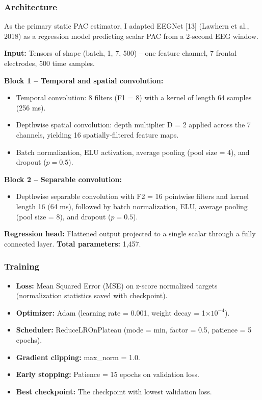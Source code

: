 \documentclass[11pt,letterpaper]{article}
\begin{document}
\subsubsection{Architecture}

As the primary static PAC estimator, I adapted EEGNet [13] (Lawhern et al., 2018) as a regression model predicting scalar PAC from a 2-second EEG window.

\textbf{Input:} Tensors of shape (batch, 1, 7, 500) -- one feature channel, 7 frontal electrodes, 500 time samples.

\textbf{Block 1 -- Temporal and spatial convolution:}

\begin{itemize}[nosep]
  \item Temporal convolution: 8 filters (F1 = 8) with a kernel of length 64 samples (256 ms).
  \item Depthwise spatial convolution: depth multiplier D = 2 applied across the 7 channels, yielding 16 spatially-filtered feature maps.
  \item Batch normalization, ELU activation, average pooling (pool size = 4), and dropout ($p = 0.5$).
\end{itemize}

\textbf{Block 2 -- Separable convolution:}

\begin{itemize}[nosep]
  \item Depthwise separable convolution with F2 = 16 pointwise filters and kernel length 16 (64 ms), followed by batch normalization, ELU, average pooling (pool size = 8), and dropout ($p = 0.5$).
\end{itemize}

\textbf{Regression head:} Flattened output projected to a single scalar through a fully connected layer. \textbf{Total parameters:} 1,457.

\subsubsection{Training}

\begin{itemize}[nosep]
  \item \textbf{Loss:} Mean Squared Error (MSE) on z-score normalized targets (normalization statistics saved with checkpoint).
  \item \textbf{Optimizer:} Adam (learning rate = 0.001, weight decay = 1$\times 10^{-4}$).
  \item \textbf{Scheduler:} ReduceLROnPlateau (mode = min, factor = 0.5, patience = 5 epochs).
  \item \textbf{Gradient clipping:} max\_norm = 1.0.
  \item \textbf{Early stopping:} Patience = 15 epochs on validation loss.
  \item \textbf{Best checkpoint:} The checkpoint with lowest validation loss.
\end{itemize}
\end{document}
